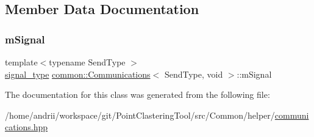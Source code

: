\subsection{Member Data Documentation}
\mbox{\label{classcommon_1_1Communications_3_01SendType_00_01void_01_4_a72b8aa8455e087419d92642f77ea0cf4}} 
\subsubsection{\texorpdfstring{m\+Signal}{mSignal}}
{\footnotesize\ttfamily template$<$typename Send\+Type $>$ \\
\mbox{\hyperlink{classcommon_1_1Communications_3_01SendType_00_01void_01_4_a9bae0c78acbf37200d02670f0b978120}{signal\+\_\+type}} \mbox{\hyperlink{classcommon_1_1Communications}{common\+::\+Communications}}$<$ Send\+Type, void $>$\+::m\+Signal\hspace{0.3cm}{\ttfamily [private]}}



The documentation for this class was generated from the following file\+:\begin{DoxyCompactItemize}
\item 
/home/andrii/workspace/git/\+Point\+Clastering\+Tool/src/\+Common/helper/\mbox{\hyperlink{communications_8hpp}{communications.\+hpp}}\end{DoxyCompactItemize}
